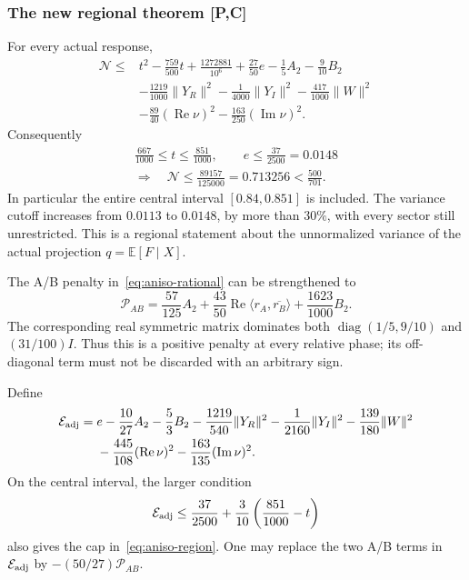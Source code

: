 \subsubsection{The new regional theorem [P,C]}
For every actual response,
\begin{equation}\label{eq:aniso-rational}
\boxed{\begin{aligned}
 \mathcal N\le{}&t^2-\frac{759}{500}t+\frac{1272881}{10^6}
                   +\frac{27}{50}e-\frac15A_2-\frac9{10}B_2\\
 &-\frac{1219}{1000}\|Y_R\|^2-\frac1{4000}\|Y_I\|^2
       -\frac{417}{1000}\|W\|^2\\
 &-\frac{89}{40}(\operatorname{Re}\nu)^2
       -\frac{163}{250}(\operatorname{Im}\nu)^2.
\end{aligned}}
\end{equation}
Consequently
\begin{equation}\label{eq:aniso-region}
 \boxed{\begin{gathered}
 \frac{667}{1000}\le t\le\frac{851}{1000},\qquad
 e\le\frac{37}{2500}=0.0148\\
 \Longrightarrow\quad
 \mathcal N\le\frac{89157}{125000}=0.713256<\frac{500}{701}.
 \end{gathered}}
\end{equation}
In particular the entire central interval $[0.84,0.851]$ is included.
The variance cutoff increases from $0.0113$ to $0.0148$, by more than
$30\%$, with every sector still unrestricted. This is a regional statement
about the unnormalized variance of the actual projection
$q=\mathbb E[F\mid X]$.

The A/B penalty in~\eqref{eq:aniso-rational} can be strengthened to
\begin{equation}\label{eq:aniso-AB}
 \mathcal P_{AB}=\frac{57}{125}A_2+
 \frac{43}{50}\operatorname{Re}\langle r_A,\overline{r_B}\rangle
       +\frac{1623}{1000}B_2.
\end{equation}
The corresponding real symmetric matrix dominates both
$\operatorname{diag}(1/5,9/10)$ and $(31/100)I$. Thus this is a positive
penalty at every relative phase; its off-diagonal term must not be discarded
with an arbitrary sign.

Define
\[
\begin{aligned}
 \mathcal E_{\rm adj}={}&e-\frac{10}{27}A_2-\frac53B_2
 -\frac{1219}{540}\|Y_R\|^2-\frac1{2160}\|Y_I\|^2
 -\frac{139}{180}\|W\|^2\\
 &-\frac{445}{108}(\operatorname{Re}\nu)^2
 -\frac{163}{135}(\operatorname{Im}\nu)^2.
\end{aligned}
\]
On the central interval, the larger condition
\begin{equation}\label{eq:aniso-adjusted}
 \mathcal E_{\rm adj}\le\frac{37}{2500}
       +\frac3{10}\left(\frac{851}{1000}-t\right)
\end{equation}
also gives the cap in~\eqref{eq:aniso-region}. One may replace the two
A/B terms in $\mathcal E_{\rm adj}$ by $-(50/27)\mathcal P_{AB}$.

